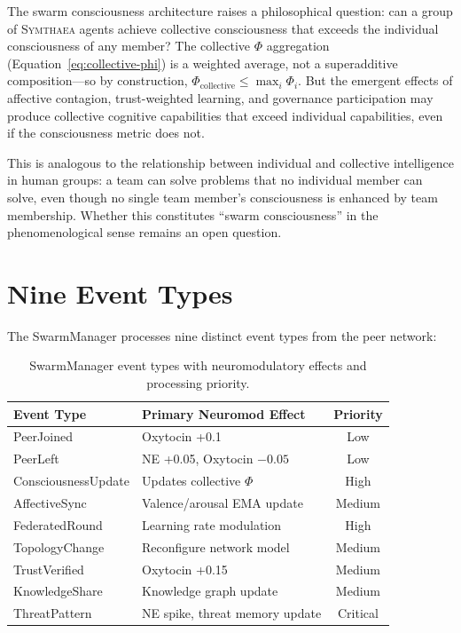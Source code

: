 \documentclass[12pt]{book}
\newcommand{\symthaea}{\textsc{Symthaea}}
\begin{document}
The swarm consciousness architecture raises a philosophical question: can a group of \symthaea{} agents achieve collective consciousness that exceeds the individual consciousness of any member? The collective $\Phi$ aggregation (Equation~\ref{eq:collective-phi}) is a weighted average, not a superadditive composition---so by construction, $\Phi_{\text{collective}} \leq \max_i \Phi_i$. But the emergent effects of affective contagion, trust-weighted learning, and governance participation may produce collective cognitive capabilities that exceed individual capabilities, even if the consciousness metric does not.

This is analogous to the relationship between individual and collective intelligence in human groups: a team can solve problems that no individual member can solve, even though no single team member's consciousness is enhanced by team membership. Whether this constitutes ``swarm consciousness'' in the phenomenological sense remains an open question.

\section{Nine Event Types}

The SwarmManager processes nine distinct event types from the peer network:

\begin{table}[H]
\centering
\caption{SwarmManager event types with neuromodulatory effects and processing priority.}
\label{tab:swarm-events}
\begin{tabular}{llc}
\toprule
\textbf{Event Type} & \textbf{Primary Neuromod Effect} & \textbf{Priority} \\
\midrule
PeerJoined & Oxytocin +0.1 & Low \\
PeerLeft & NE +0.05, Oxytocin $-0.05$ & Low \\
ConsciousnessUpdate & Updates collective $\Phi$ & High \\
AffectiveSync & Valence/arousal EMA update & Medium \\
FederatedRound & Learning rate modulation & High \\
TopologyChange & Reconfigure network model & Medium \\
TrustVerified & Oxytocin +0.15 & Medium \\
KnowledgeShare & Knowledge graph update & Medium \\
ThreatPattern & NE spike, threat memory update & Critical \\
\bottomrule
\end{tabular}
\end{table}
\end{document}
